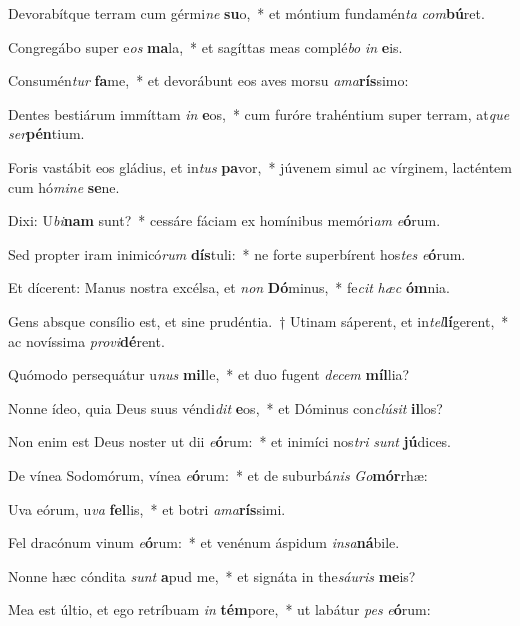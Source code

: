\item Devorabítque terram cum gérmi\textit{ne} \textbf{su}o,~* et móntium fundamén\textit{ta} \textit{com}\textbf{bú}ret.
\item Congregábo super e\textit{os} \textbf{ma}la,~* et sagíttas meas complé\textit{bo} \textit{in} \textbf{e}is.
\item Consumén\textit{tur} \textbf{fa}me,~* et devorábunt eos aves morsu \textit{a}\textit{ma}\textbf{rís}simo:
\item Dentes bestiárum immíttam \textit{in} \textbf{e}os,~* cum furóre trahéntium super terram, at\textit{que} \textit{ser}\textbf{pén}tium.
\item Foris vastábit eos gládius, et in\textit{tus} \textbf{pa}vor,~* júvenem simul ac vírginem, lacténtem cum hó\textit{mi}\textit{ne} \textbf{se}ne.
\item Dixi: U\textit{bi}\textbf{nam} sunt?~* cessáre fáciam ex homínibus memóri\textit{am} \textit{e}\textbf{ó}rum.
\item Sed propter iram inimicó\textit{rum} \textbf{dís}tuli:~* ne forte superbírent hos\textit{tes} \textit{e}\textbf{ó}rum.
\item Et dícerent: Manus nostra excélsa, et \textit{non} \textbf{Dó}minus,~* fe\textit{cit} \textit{hæc} \textbf{óm}nia.
\item Gens absque consílio est, et sine prudéntia.~† Utinam sáperent, et in\textit{tel}\textbf{lí}gerent,~* ac novíssima \textit{pro}\textit{vi}\textbf{dé}rent.
\item Quómodo persequátur u\textit{nus} \textbf{mil}le,~* et duo fugent \textit{de}\textit{cem} \textbf{míl}lia?
\item Nonne ídeo, quia Deus suus véndi\textit{dit} \textbf{e}os,~* et Dóminus con\textit{clú}\textit{sit} \textbf{il}los?
\item Non enim est Deus noster ut dii \textit{e}\textbf{ó}rum:~* et inimíci nos\textit{tri} \textit{sunt} \textbf{jú}dices.
\item De vínea Sodomórum, vínea \textit{e}\textbf{ó}rum:~* et de suburbá\textit{nis} \textit{Go}\textbf{mór}rhæ:
\item Uva eórum, u\textit{va} \textbf{fel}lis,~* et botri \textit{a}\textit{ma}\textbf{rís}simi.
\item Fel dracónum vinum \textit{e}\textbf{ó}rum:~* et venénum áspidum \textit{in}\textit{sa}\textbf{ná}bile.
\item Nonne hæc cóndita \textit{sunt} \textbf{a}pud me,~* et signáta in the\textit{sáu}\textit{ris} \textbf{me}is?
\item Mea est últio, et ego retríbuam \textit{in} \textbf{tém}pore,~* ut labátur \textit{pes} \textit{e}\textbf{ó}rum:
